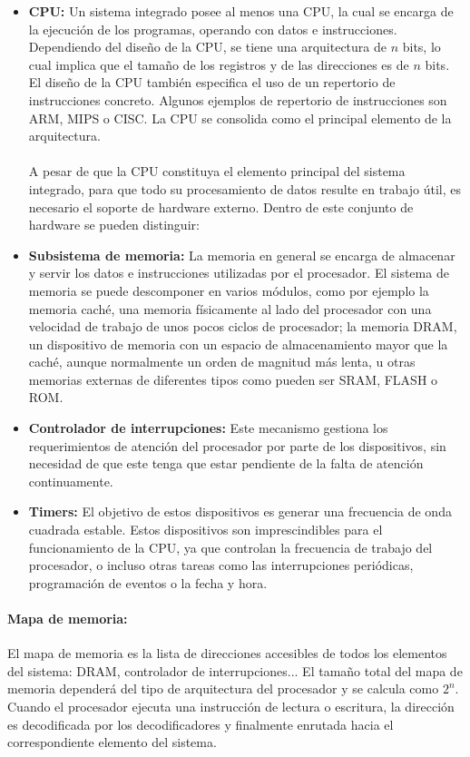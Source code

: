\begin{itemize}
\item \textbf{CPU:} Un sistema integrado posee al menos una CPU, la cual se encarga de la ejecuci\'on de los programas, operando con datos e instrucciones. Dependiendo del diseño de la CPU, se tiene una arquitectura de $n$ bits, lo cual implica que el tamaño de los registros y de las direcciones es de $n$ bits. El diseño de la CPU también especifica el uso de un repertorio de instrucciones concreto. Algunos ejemplos de repertorio de instrucciones son ARM, MIPS o CISC. La CPU se consolida como el principal elemento de la arquitectura.
\paragraph{}
   A pesar de que la CPU constituya el elemento principal del sistema integrado, para que todo su procesamiento de datos resulte en trabajo \'util, es necesario el soporte de hardware externo. Dentro de este conjunto de hardware se pueden distinguir:
\item \textbf{Subsistema de memoria:} La memoria en general se encarga de almacenar y servir los datos e instrucciones utilizadas por el procesador. El sistema de memoria se puede descomponer en varios m\'odulos, como por ejemplo la memoria cach\'e, una memoria f\'isicamente al lado del procesador con una velocidad de trabajo de unos pocos ciclos de procesador; la memoria DRAM, un dispositivo de memoria con un espacio de almacenamiento mayor que la cach\'e, aunque normalmente un orden de magnitud m\'as lenta, u otras memorias externas de diferentes tipos como pueden ser SRAM, FLASH o ROM.
\item \textbf{Controlador de interrupciones:} Este mecanismo gestiona los requerimientos de atención del procesador por parte de los dispositivos, sin necesidad de que este tenga que estar pendiente de la falta de atención continuamente.
\item \textbf{Timers:} El objetivo de estos dispositivos es generar una frecuencia de onda cuadrada estable. Estos dispositivos son imprescindibles para el funcionamiento de la CPU, ya que controlan la frecuencia de trabajo del procesador, o incluso otras tareas como las interrupciones periódicas, programación de eventos o la fecha y hora.
\end{itemize}
\paragraph{Mapa de memoria:} El mapa de memoria es la lista de direcciones accesibles de todos los elementos del sistema: DRAM, controlador de interrupciones... El tamaño total del mapa de memoria dependerá del tipo de arquitectura del procesador y se calcula como $2^n$. Cuando el procesador ejecuta una instrucción de lectura o escritura, la dirección es decodificada por los decodificadores y finalmente enrutada hacia el correspondiente elemento del sistema.


